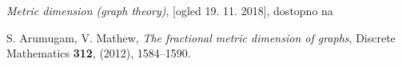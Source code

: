 \documentclass[a4paper]{report}
\begin{document}
\begin{thebibliography}{99}

 \textit{Metric dimension (graph theory)}, [ogled 19. 11. 2018], dostopno na %

 S. Arumugam, V. Mathew, \textit{The fractional metric dimension of graphs}, Discrete Mathematics \textbf{312},  (2012), 1584–1590.

\end{thebibliography}
\end{document}
